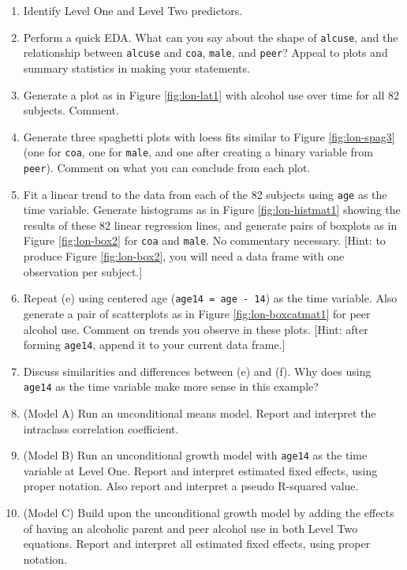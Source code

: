 \documentclass[
]{krantz}
\begin{document}
\begin{enumerate}
  \begin{enumerate}
  \def\labelenumii{\alph{enumii}.}
  \item
    Identify Level One and Level Two predictors.
  \item
    Perform a quick EDA. What can you say about the shape of \texttt{alcuse}, and the relationship between \texttt{alcuse} and \texttt{coa}, \texttt{male}, and \texttt{peer}? Appeal to plots and summary statistics in making your statements.
  \item
    Generate a plot as in Figure \ref{fig:lon-lat1} with alcohol use over time for all 82 subjects. Comment.
  \item
    Generate three spaghetti plots with loess fits similar to Figure \ref{fig:lon-spag3} (one for \texttt{coa}, one for \texttt{male}, and one after creating a binary variable from \texttt{peer}). Comment on what you can conclude from each plot.
  \item
    Fit a linear trend to the data from each of the 82 subjects using \texttt{age} as the time variable. Generate histograms as in Figure \ref{fig:lon-histmat1} showing the results of these 82 linear regression lines, and generate pairs of boxplots as in Figure \ref{fig:lon-box2} for \texttt{coa} and \texttt{male}. No commentary necessary. {[}Hint: to produce Figure \ref{fig:lon-box2}, you will need a data frame with one observation per subject.{]}
  \item
    Repeat (e) using centered age (\texttt{age14\ =\ age\ -\ 14}) as the time variable. Also generate a pair of scatterplots as in Figure \ref{fig:lon-boxcatmat1} for peer alcohol use. Comment on trends you observe in these plots. {[}Hint: after forming \texttt{age14}, append it to your current data frame.{]}
  \item
    Discuss similarities and differences between (e) and (f). Why does using \texttt{age14} as the time variable make more sense in this example?
  \item
    (Model A) Run an unconditional means model. Report and interpret the intraclass correlation coefficient.
  \item
    (Model B) Run an unconditional growth model with \texttt{age14} as the time variable at Level One. Report and interpret estimated fixed effects, using proper notation. Also report and interpret a pseudo R-squared value.
  \item
    (Model C) Build upon the unconditional growth model by adding the effects of having an alcoholic parent and peer alcohol use in both Level Two equations. Report and interpret all estimated fixed effects, using proper notation.

\end{enumerate}
\end{enumerate}
\end{document}
